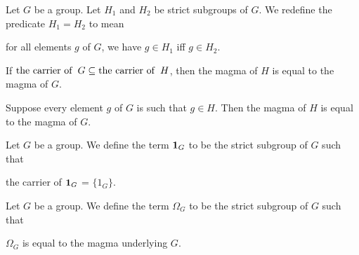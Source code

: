 \documentclass{article}
\begin{document}
\begin{definition}
Let $G$ be a group. Let $H_{1}$ and $H_{2}$ be strict subgroups of $G$.
We redefine the predicate $H_{1}=H_{2}$ to mean
\begin{defn}
\item for all elements $g$ of $G$, we have $g\in H_{1}$ iff $g\in H_{2}$.
\end{defn}
\end{definition}

\begin{thm}
\item\label{group2:61} If $\operatorname{the\ carrier\ of\ }G\subseteq\operatorname{the\ carrier\ of\ }H$, then the
  magma of $H$ is equal to the magma of $G$.
\item\label{group2:62} Suppose every element $g$ of $G$ is such that
  $g\in H$.
  Then the magma of $H$ is equal to the magma of $G$.
\end{thm}

\begin{definition}
Let $G$ be a group. We define the term $\mathbf{1}_{G}$ to be the
strict subgroup of $G$ such that
\begin{defn}
\item the carrier of $\mathbf{1}_{G}$ = $\{1_{G}\}$.
\end{defn}
\end{definition}

\begin{definition}
Let $G$ be a group. We define the term $\Omega_{G}$ to be the
strict subgroup of $G$ such that
\begin{defn}
\item $\Omega_{G}$ is equal to the magma underlying $G$.
\end{defn}
\end{definition}
\end{document}
